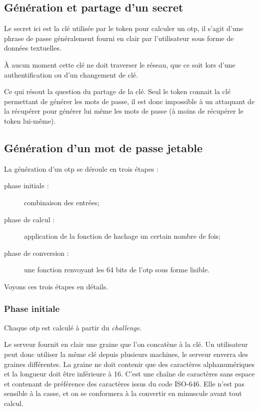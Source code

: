 \documentclass{../res/univ-projet}
\begin{document}
  \subsection{Génération et partage d'un secret}
    Le secret ici est la clé utilisée par le token pour calculer un otp, il 
s'agit d'une phrase de passe généralement fourni en clair par l'utilisateur 
sous forme de données textuelles. 

    À aucun moment cette clé ne doit traverser le réseau, que ce soit lors 
d'une authentification ou d'un changement de clé.

    Ce qui résout la question du partage de la clé. Seul le token connait la 
clé permettant de générer les mots de passe, il est donc impossible à un attaquant 
de la récupérer pour générer lui même les mots de passe (à moins de récupérer 
le token lui-même).

  \subsection{Génération d'un mot de passe jetable}

    La génération d'un otp se déroule en trois étapes :
    \begin{description}
      \item [phase initiale :] combinaison des entrées;
      \item [phase de calcul :] application de la fonction de hachage un 
      certain nombre de fois;
      \item [phase de conversion :] une fonction renvoyant les 64 bits de l'otp 
      sous forme lisible.\\
    \end{description}

    Voyons ces trois étapes en détails.

    \subsubsection{Phase initiale}
      Chaque otp est calculé à partir du \emph{challenge}.

      Le serveur fournit en clair une graine que l'on concatène à la clé. Un 
utilisateur peut donc utiliser la même clé depuis plusieurs machines, le serveur 
enverra des graines différentes. La graine ne doit contenir que des caractères 
alphanumériques et la longueur doit être inférieure à 16. C'est une chaîne de 
caractères sans espace et contenant de préférence des caractères issus du code 
ISO-646. Elle n'est pas sensible à la casse, et on se conformera à la convertir 
en minuscule avant tout calcul.
\end{document}
